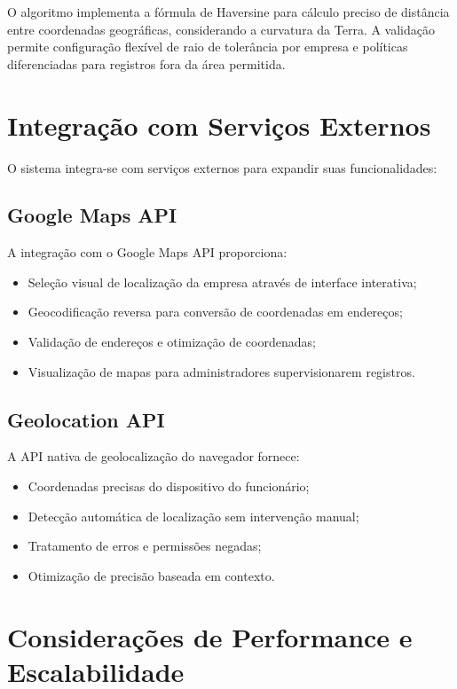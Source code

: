O algoritmo implementa a fórmula de Haversine para cálculo preciso de distância entre coordenadas geográficas, considerando a curvatura da Terra. A validação permite configuração flexível de raio de tolerância por empresa e políticas diferenciadas para registros fora da área permitida.

\section{Integração com Serviços Externos}

O sistema integra-se com serviços externos para expandir suas funcionalidades:

\subsection{Google Maps API}

A integração com o Google Maps API proporciona:

\begin{itemize}
    \item Seleção visual de localização da empresa através de interface interativa;
    \item Geocodificação reversa para conversão de coordenadas em endereços;
    \item Validação de endereços e otimização de coordenadas;
    \item Visualização de mapas para administradores supervisionarem registros.
\end{itemize}

\subsection{Geolocation API}

A API nativa de geolocalização do navegador fornece:

\begin{itemize}
    \item Coordenadas precisas do dispositivo do funcionário;
    \item Detecção automática de localização sem intervenção manual;
    \item Tratamento de erros e permissões negadas;
    \item Otimização de precisão baseada em contexto.
\end{itemize}

\section{Considerações de Performance e Escalabilidade}

